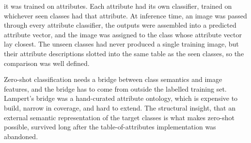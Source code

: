  it was trained on attributes. Each attribute had its own classifier, trained on whichever seen classes had that attribute. At inference time, an image was passed through every attribute classifier, the outputs were assembled into a predicted attribute vector, and the image was assigned to the class whose attribute vector lay closest. The unseen classes had never produced a single training image, but their attribute descriptions slotted into the same table as the seen classes, so the comparison was well defined.

 Zero-shot classification needs a bridge between class semantics and image features, and the bridge has to come from outside the labelled training set. Lampert's bridge was a hand-curated attribute ontology, which is expensive to build, narrow in coverage, and hard to extend. The structural insight, that an external semantic representation of the target classes is what makes zero-shot possible, survived long after the table-of-attributes implementation was abandoned.

